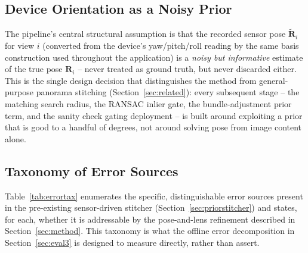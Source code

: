 \documentclass[11pt]{article}
\newcommand{\mat}[1]{\mathbf{#1}}
\begin{document}
\subsection{Device Orientation as a Noisy Prior}

The pipeline's central structural assumption is that the recorded sensor pose $\tilde{\mat{R}}_i$ for view $i$ (converted from the device's yaw/pitch/roll reading by the same basis construction used throughout the application) is a \emph{noisy but informative} estimate of the true pose $\mat{R}_i$ -- never treated as ground truth, but never discarded either. This is the single design decision that distinguishes the method from general-purpose panorama stitching (Section~\ref{sec:related}): every subsequent stage -- the matching search radius, the RANSAC inlier gate, the bundle-adjustment prior term, and the sanity check gating deployment -- is built around exploiting a prior that is good to a handful of degrees, not around solving pose from image content alone.

\subsection{Taxonomy of Error Sources}
\label{sec:errortax}

Table~\ref{tab:errortax} enumerates the specific, distinguishable error sources present in the pre-existing sensor-driven stitcher (Section~\ref{sec:priorstitcher}) and states, for each, whether it is addressable by the pose-and-lens refinement described in Section~\ref{sec:method}. This taxonomy is what the offline error decomposition in Section~\ref{sec:eval3} is designed to measure directly, rather than assert.
\end{document}
